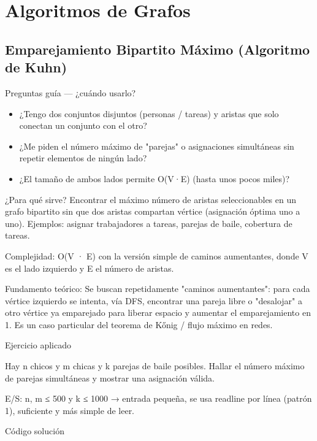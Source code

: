 \section{Algoritmos de Grafos}

\subsection{Emparejamiento Bipartito Máximo (Algoritmo de Kuhn)}

Preguntas guía — ¿cuándo usarlo?

\begin{itemize}
\item ¿Tengo dos conjuntos disjuntos (personas / tareas) y aristas que solo conectan un conjunto con el otro?
\item ¿Me piden el número máximo de "parejas" o asignaciones simultáneas sin repetir elementos de ningún lado?
\item ¿El tamaño de ambos lados permite O(V·E) (hasta unos pocos miles)?
\end{itemize}

¿Para qué sirve? Encontrar el máximo número de aristas seleccionables en un grafo bipartito sin que dos aristas compartan vértice (asignación óptima uno a uno). Ejemplos: asignar trabajadores a tareas, parejas de baile, cobertura de tareas.

Complejidad: O(V · E) con la versión simple de caminos aumentantes, donde V es el lado izquierdo y E el número de aristas.

Fundamento teórico: Se buscan repetidamente "caminos aumentantes": para cada vértice izquierdo se intenta, vía DFS, encontrar una pareja libre o "desalojar" a otro vértice ya emparejado para liberar espacio y aumentar el emparejamiento en 1. Es un caso particular del teorema de Kőnig / flujo máximo en redes.

Ejercicio aplicado

Hay n chicos y m chicas y k parejas de baile posibles. Hallar el número máximo de parejas simultáneas y mostrar una asignación válida.

E/S: n, m ≤ 500 y k ≤ 1000 → entrada pequeña, se usa readline por línea (patrón 1), suficiente y más simple de leer.

Código solución

